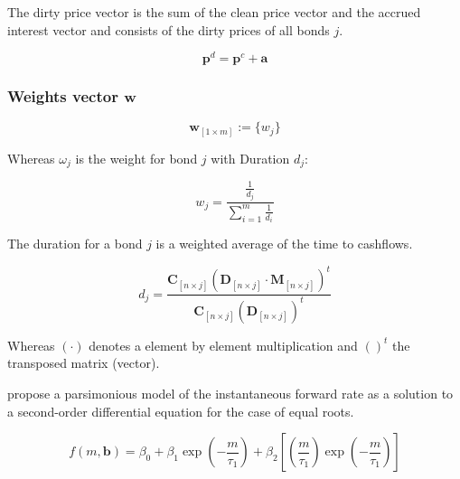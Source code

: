 The dirty price vector is the sum of the clean price vector and the accrued interest vector and consists of the dirty prices of all bonds $j$.

\begin{displaymath}
\bm{p}^d=\bm{p}^c+\bm{a}
\end{displaymath}

\subsubsection*{Weights vector $\bm{w}$}

\begin{equation}\label{weights}
    \bm{w}_{\left[1\times m\right]}:= \{w_j\}
\end{equation}

Whereas $\omega_j$ is the weight for bond $j$ with Duration $d_j$:

\begin{displaymath}
    w_j=\frac{\frac{1}{d_j}}{\sum_{i=1}^m\frac{1}{d_i}}
\end{displaymath}


The duration for a bond $j$ is a weighted average of the time to cashflows.

\begin{equation}\label{duration}
d_j= \frac{\bm{C}_{\left[n \times j\right]} \left(\bm{D}_{\left[n\times j\right]} \cdot \bm{M}_{\left[n\times j\right]}\right)^t} {\bm{C}_{\left[n \times j\right]}\left(\bm{D}_{\left[n\times j\right]}\right)^t}
\end{equation}

Whereas $(\cdot)$ denotes a element by element multiplication and $( )^t$ the transposed matrix (vector).

\cite{Nelson1987} propose a parsimonious  model of  the instantaneous forward rate as a solution to a second-order differential equation for the case of equal roots.

\begin{equation}
  \label{eq:laguerre}
  f(m,\bm{b}) = \beta_0+\beta_1\exp\left(-\frac{m}{\tau_1}\right)+\beta_2\left[\left(\frac{m}{\tau_1}\right)\exp\left(-\frac{m}{\tau_1}\right)\right]
\end{equation}


